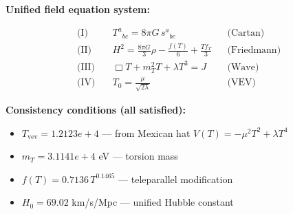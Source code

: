
\textbf{Unified field equation system:}

\begin{align}
  \text{(I)} \quad & T^a{}_{bc} = 8\pi G \, s^a{}_{bc} && \text{(Cartan)} \\
  \text{(II)} \quad & H^2 = \frac{8\pi G}{3}\rho - \frac{f(T)}{6} + \frac{Tf_T}{3} && \text{(Friedmann)} \\
  \text{(III)} \quad & \Box T + m_T^2 T + \lambda T^3 = J && \text{(Wave)} \\
  \text{(IV)} \quad & T_0 = \frac{\mu}{\sqrt{2\lambda}} && \text{(VEV)}
\end{align}

\textbf{Consistency conditions (all satisfied):}
\begin{itemize}
  \item $T_{\text{vev}} = 1.2123e+4$ — from Mexican hat $V(T) = -\mu^2 T^2 + \lambda T^4$
  \item $m_T = 3.1141e+4$ eV — torsion mass
  \item $f(T) = 0.7136 \, T^{0.1465}$ — teleparallel modification
  \item $H_0 = 69.02$ km/s/Mpc — unified Hubble constant
\end{itemize}